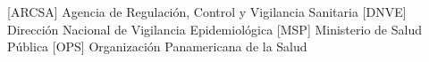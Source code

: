 \begin{acronym} 
 [ARCSA] {Agencia de Regulación, Control y Vigilancia Sanitaria}
 [DNVE] {Dirección Nacional de Vigilancia Epidemiológica}
 [MSP] {Ministerio de Salud Pública}
 [OPS] {Organización Panamericana de la Salud}
\end{acronym}